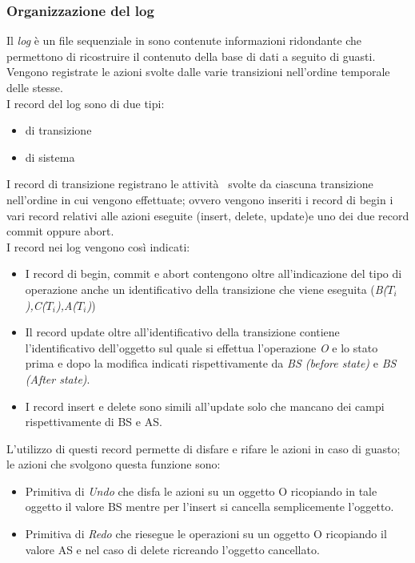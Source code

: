 \subsubsection{Organizzazione del log}
Il \emph{log} è un file sequenziale in sono contenute informazioni ridondante che permettono di ricostruire il contenuto della base di dati a seguito di guasti. Vengono registrate le azioni svolte dalle varie transizioni nell'ordine temporale delle stesse.\\
I record del log sono di due tipi:
\begin{itemize}
\item di transizione
\item di sistema
\end{itemize}
I record di transizione registrano le attività  svolte da ciascuna transizione nell'ordine in cui vengono effettuate; ovvero vengono inseriti i record di \textsf{begin} i vari record relativi alle azioni eseguite (\textsf{insert, delete, update})e uno dei due record \textsf{commit} oppure \textsf{abort}.\\
I record nei log vengono così indicati:
\begin{itemize}
\item I record di \textsf{begin, commit e abort} contengono oltre all'indicazione del tipo di operazione anche un identificativo della transizione che viene eseguita (\emph{B($T_i$),C($T_i$),A($T_i$)})
\item Il record \textsf{update} oltre all'identificativo della transizione contiene l'identificativo dell'oggetto sul quale si effettua l'operazione \emph{O} e lo stato prima e dopo la modifica indicati rispettivamente da \emph{BS (before state)} e \emph{BS (After state)}.
\item I record \textsf{insert} e \textsf{delete} sono simili all'update solo che mancano dei campi rispettivamente di BS e AS.
\end{itemize}
L'utilizzo di questi record permette di disfare e rifare le azioni in caso di guasto; le azioni che svolgono questa funzione sono:
\begin{itemize}
\item Primitiva di \emph{Undo} che disfa le azioni su un oggetto O ricopiando in tale oggetto il valore BS mentre per l'insert si cancella semplicemente l'oggetto.
\item Primitiva di \emph{Redo} che riesegue le operazioni su un oggetto O ricopiando il valore AS e nel caso di delete ricreando l'oggetto cancellato.
\end{itemize}
